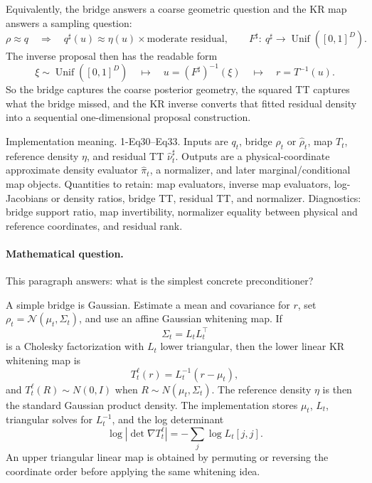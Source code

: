 \documentclass[11pt]{article}
\numberwithin{equation}{section}
\begin{document}
Equivalently, the bridge answers a coarse geometric question and the KR map
answers a sampling question:
\begin{equation}
    \rho \approx q
    \quad\Longrightarrow\quad
    q^\sharp(u)\approx \eta(u)\times\text{moderate residual},
    \qquad
    F^\sharp:\ q^\sharp \longrightarrow \operatorname{Unif}([0,1]^D).
    \label{eq:p26-prec-teach-8}
\end{equation}
The inverse proposal then has the readable form
\begin{equation}
    \xi\sim\operatorname{Unif}([0,1]^D)
    \quad\mapsto\quad
    u=(F^\sharp)^{-1}(\xi)
    \quad\mapsto\quad
    r=T^{-1}(u).
    \label{eq:p26-prec-teach-9}
\end{equation}
So the bridge captures the coarse posterior geometry, the squared TT captures
what the bridge missed, and the KR inverse converts that fitted residual
density into a sequential one-dimensional proposal construction.

Implementation meaning. 1-Eq30--Eq33.  Inputs are \(q_t\), bridge
\(\rho_t\) or \(\widehat\rho_t\), map \(T_t\), reference density \(\eta\), and
residual TT \(\widehat\nu_t^\sharp\).  Outputs are a physical-coordinate
approximate density evaluator \(\widehat\pi_t\), a normalizer, and later
marginal/conditional map objects.  Quantities to retain: map evaluators, inverse map
evaluators, log-Jacobians or density ratios, bridge TT, residual TT, and
normalizer.  Diagnostics: bridge support ratio, map invertibility,
normalizer equality between physical and reference coordinates, and residual
rank.

\paragraph{Mathematical question.}
This paragraph answers: what is the simplest concrete preconditioner?

A simple bridge is Gaussian.  Estimate a mean and covariance for \(r\), set
\(\rho_t=\mathcal N(\mu_t,\Sigma_t)\), and use an affine Gaussian whitening map.
If
\begin{equation}
    \Sigma_t=L_tL_t^\top
    \label{eq:p24-p6a}
\end{equation}
is a Cholesky factorization with \(L_t\) lower triangular, then the lower
linear KR whitening map is
\begin{equation}
    T_t^{\ell}(r)
    =
    L_t^{-1}(r-\mu_t),
    \label{eq:p24-p6b}
\end{equation}
and \(T_t^{\ell}(R)\sim N(0,I)\) when \(R\sim N(\mu_t,\Sigma_t)\).  The
reference density \(\eta\) is then the standard Gaussian product density.  The
implementation stores \(\mu_t\), \(L_t\), triangular solves for \(L_t^{-1}\),
and the log determinant
\begin{equation}
    \log|\det\nabla T_t^{\ell}|
    =
    -\sum_j\log L_t[j,j].
    \label{eq:p24-p6c}
\end{equation}
An upper triangular linear map is obtained by permuting or reversing the
coordinate order before applying the same whitening idea.
\end{document}
